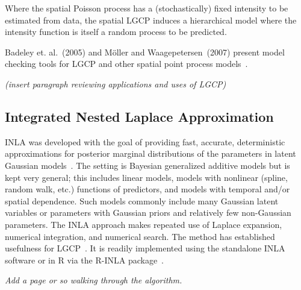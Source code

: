 \documentclass[]{interact}
\begin{document}
Where the spatial Poisson process has a (stochastically) fixed intensity to be
estimated from data, the spatial LGCP induces a hierarchical model where the
intensity function is itself a random process to be predicted.

Badeley et. al.~(2005) and M\"{o}ller and Waagepetersen~(2007) present model
checking tools for LGCP and other spatial point process
models~\cite{baddeleyresiduals,moellerwaagepetersen}.

{\it (insert paragraph reviewing applications and uses of LGCP)}


\subsection{Integrated Nested Laplace Approximation}
\label{inla}

INLA was developed with the goal of providing fast, accurate, deterministic
approximations for posterior marginal distributions of the parameters in
latent Gaussian models~\cite{rueetal}. The setting is Bayesian generalized
additive models but is kept very general; this includes linear models, models
with nonlinear (spline, random walk, etc.) functions of predictors, and models
with temporal and/or spatial dependence. Such models commonly include many
Gaussian latent variables or parameters with Gaussian priors and relatively
few non-Gaussian parameters. The INLA approach makes repeated use of Laplace
expansion, numerical integration, and numerical search. The method has
established usefulness for LGCP~\cite{illianetal}. It is readily implemented
using the standalone INLA software or in R via the R-INLA
package~\cite{inlar}.

{\it Add a page or so walking through the algorithm.}







\end{document}
